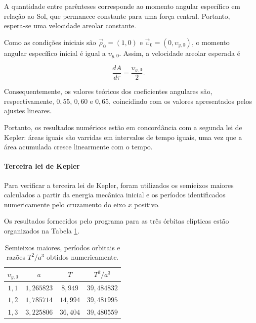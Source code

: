 \documentclass[12pt,a4paper]{article}
\begin{document}
A quantidade entre parênteses corresponde ao momento angular específico em relação ao Sol, que permanece constante para uma força central. Portanto, espera-se uma velocidade areolar constante.

Como as condições iniciais são $\vec{\rho}_0=(1,0)$ e $\vec{\upsilon}_0=(0,\upsilon_{y,0})$, o momento angular específico inicial é igual a $\upsilon_{y,0}$. Assim, a velocidade areolar esperada é

\begin{equation}
    \frac{dA}{d\tau}
    =\frac{\upsilon_{y,0}}{2}.
\end{equation}

Consequentemente, os valores teóricos dos coeficientes angulares são, respectivamente, $0,55$, $0,60$ e $0,65$, coincidindo com os valores apresentados pelos ajustes lineares.

Portanto, os resultados numéricos estão em concordância com a segunda lei de Kepler: áreas iguais são varridas em intervalos de tempo iguais, uma vez que a área acumulada cresce linearmente com o tempo.

\paragraph{Terceira lei de Kepler}

Para verificar a terceira lei de Kepler, foram utilizados os semieixos maiores calculados a partir da energia mecânica inicial e os períodos identificados numericamente pelo cruzamento do eixo $x$ positivo.

Os resultados fornecidos pelo programa para as três órbitas elípticas estão organizados na Tabela \ref{tab:terceira-lei}.

\begin{table}[htbp]
    \centering
    \caption{Semieixos maiores, períodos orbitais e razões $T^2/a^3$ obtidos numericamente.}
    \label{tab:terceira-lei}
    \begin{tabular}{c c c c}
        \hline
        $\upsilon_{y,0}$ & $a$ & $T$ & $T^2/a^3$\\
        \hline
        $1,1$ & $1,265823$ & $8,949$ & $39,484832$\\
        $1,2$ & $1,785714$ & $14,994$ & $39,481995$\\
        $1,3$ & $3,225806$ & $36,404$ & $39,480559$\\
        \hline
    \end{tabular}
\end{table}
\end{document}
